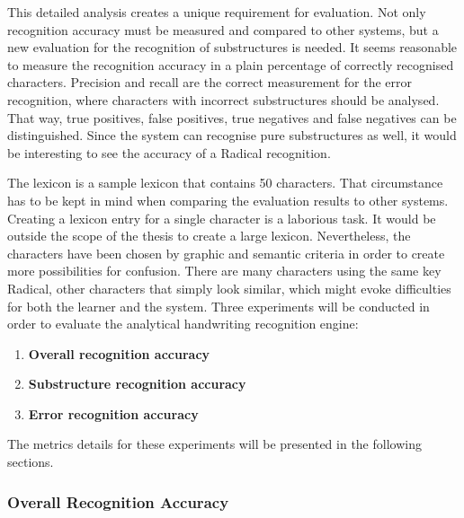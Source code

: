 This detailed analysis creates a unique requirement for evaluation. Not only
recognition accuracy must be measured and compared to other systems,
but a new evaluation for the recognition of substructures is needed.
It seems reasonable to measure the recognition accuracy in a plain 
percentage of correctly recognised characters. 
Precision and recall are the correct measurement for the error recognition,
where characters with incorrect substructures should be analysed. 
That way, true positives, false positives, 
true negatives and false negatives can be distinguished.
Since the system can recognise pure substructures as well, it would 
be interesting to see the accuracy of a Radical recognition.

The lexicon is a sample lexicon that contains 50 characters. That circumstance
has to be kept in mind when comparing the evaluation results to other
systems. Creating a lexicon entry for a single character is a laborious task.
It would be outside the scope of the thesis to create a large lexicon.
Nevertheless, the characters have been chosen by graphic and
semantic criteria in order to create more possibilities for confusion.
There are many characters using the same key Radical, other characters
that simply look similar, which might evoke difficulties 
for both the learner and the system.
Three experiments will be conducted in order to evaluate the analytical
handwriting recognition engine:
\begin{enumerate}
  \item \textbf{Overall recognition accuracy} \label{eval:enum:overall}
  \item \textbf{Substructure recognition accuracy} \label{eval:enum:substructure}
  \item \textbf{Error recognition accuracy} \label{eval:enum:errorrecognition}
\end{enumerate}
The metrics details for these experiments will be presented in the following 
sections.

\subsubsection{Overall Recognition Accuracy}
\label{sec:eval:overallrecognitionaccuracy}

